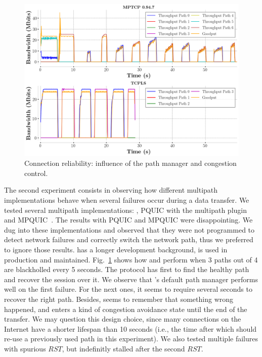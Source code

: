 \begin{figure}[!t]
  \begin{center}
    \includegraphics[width=\columnwidth]{figures/tcpls_mptcp.png}
  \end{center}
\vspace{-0.5cm}
  \caption{Connection reliability: influence of the path manager and congestion
    control.}
  \label{fig:failover}
\end{figure}

The second experiment consists in observing how different multipath
implementations behave when several failures occur during a data transfer. We
tested several multipath implementations: \mptcp, PQUIC with the multipath
plugin~\cite{de2019pluginizing} and MPQUIC~\cite{de2017multipath}.
The results with PQUIC and MPQUIC were disappointing.
We dug into these implementations and observed that they were not programmed
to detect network failures and correctly switch the network path, thus we
preferred to ignore those results. \mptcp has a longer development
background, is used in production and maintained. Fig.~\ref{fig:failover}
shows how \mptcp and \tcpls perform when 3 paths out of 4 are blackholled every
5 seconds. The protocol has first to find the healthy path and recover the
session over it. We observe that \mptcp's default path manager performs well on the first
failure. For the next ones, it seems to require several seconds to
recover the right path. Besides, \mptcp seems to remember that something wrong happened,
and enters a kind of congestion avoidance state until the end of the transfer. We
may question this design choice, since many \tcp connections on the Internet have
a shorter lifespan than 10 seconds (i.e., the time after which \mptcp should
re-use a previously used path in this experiment). We also tested multiple
failures with spurious $RST$, but \mptcp indefinitly stalled after the second $RST$.

